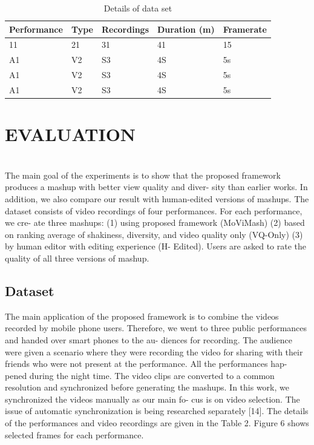 \documentclass{sig-alternate}
\providecommand{\DIFadd}[1]{{\protect\color{blue}\uwave{#1}}} %
\providecommand{\DIFaddbegin}{} %
\providecommand{\DIFaddend}{} %
\begin{document}
\begin{table}
\centering
\caption{ Details of data set }
\begin{tabular}{p{1.2cm}|p{1.2cm}|p{1.2cm}|p{1.2cm}|l} \hline
Performance&Type&Recordings&Duration 
(m)&Framerate\\ \hline
11&21&31&41&15\\ \hline
A1&V2&S3&4S&5s\\ \hline
A1&V2&S3&4S&5s\\ \hline
A1&V2&S3&4S&5s\\ \hline
\end{tabular}
\end{table}

\section{EVALUATION}
\DIFaddbegin \DIFadd{its EVALUATION }\\
\DIFaddend The main goal of the experiments is to show that the proposed
framework produces a mashup with better view quality and diver-
sity than earlier works. In addition, we also compare our result with
human-edited versions of mashups. The dataset consists of video
recordings of four performances. For each performance, we cre-
ate three mashups: (1) using proposed framework (MoViMash) (2)
based on ranking average of shakiness, diversity, and video quality only (VQ-Only) (3) by human editor with editing experience (H-
Edited). Users are asked to rate the quality of all three versions of
mashup.


\subsection{Dataset}
The main application of the proposed framework is to combine
the videos recorded by mobile phone users. Therefore, we went to
three public performances and handed over smart phones to the au-
diences for recording. The audience were given a scenario where
they were recording the video for sharing with their friends who
were not present at the performance. All the performances hap-
pened during the night time. The video clips are converted to a
common resolution and synchronized before generating the mashups.
In this work, we synchronized the videos manually as our main fo-
cus is on video selection. The issue of automatic synchronization is
being researched separately [14]. The details of the performances
and video recordings are given in the Table 2. Figure 6 shows selected frames for each performance.
\end{document}
